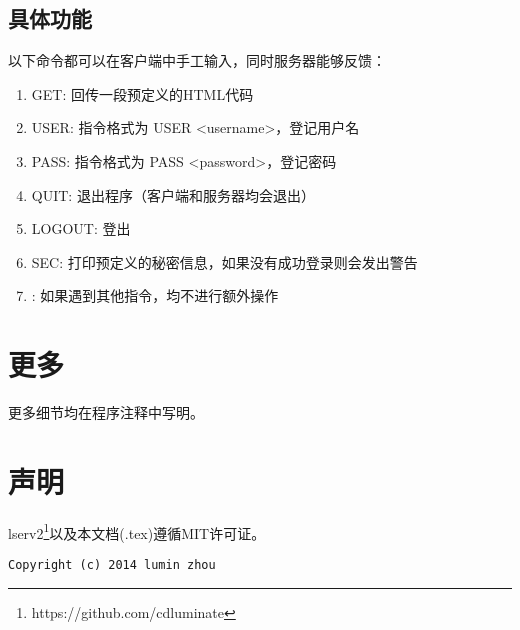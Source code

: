 \documentclass[a4paper,12pt]{article}
\begin{document}
\begin{CJK}{UTF8}{gbsn}
	\subsection{具体功能}
		以下命令都可以在客户端中手工输入，同时服务器能够反馈：
		\begin{enumerate}
		\item GET: 回传一段预定义的HTML代码
		\item USER: 指令格式为 USER <username>，登记用户名
		\item PASS: 指令格式为 PASS <password>，登记密码
		\item QUIT: 退出程序（客户端和服务器均会退出）
		\item LOGOUT: 登出
		\item SEC: 打印预定义的秘密信息，如果没有成功登录则会发出警告
		\item \*: 如果遇到其他指令，均不进行额外操作
		\end{enumerate}

\section{更多}
	更多细节均在程序注释中写明。

\section{声明}
	lserv2\footnote{https://github.com/cdluminate}以及本文档(.tex)遵循MIT许可证。
	\begin{verbatim}
Copyright (c) 2014 lumin zhou
	\end{verbatim}

\end{CJK}
\end{document}
